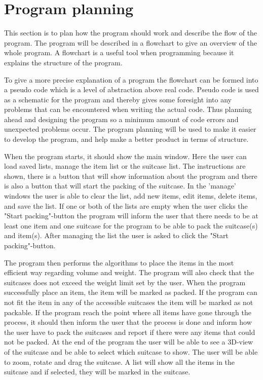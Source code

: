 \section{Program planning}
This section is to plan how the program should work and describe the flow of the program. The program will be described in a flowchart to give an overview of the whole program. A flowchart is a useful tool when programming because it explains the structure of the program.

To give a more precise explanation of a program the flowchart can be formed into a pseudo code which is a level of abstraction above real code. Pseudo code is used as a schematic for the program and thereby gives some foresight into any problems that can be encountered when writing the actual code. Thus planning ahead and designing the program so a minimum amount of code errors and unexpected problems occur.
The program planning will be used to make it easier to develop the program, and help make a better product in terms of structure.

When the program starts, it should show the main window. Here the user can load saved lists, manage the item list or the suitcase list. The instructions are shown, there is a button that will show information about the program and there is also a button that will start the packing of the suitcase. In the 'manage' windows the user is able to clear the list, add new items, edit items, delete items, and save the list. If one or both of the lists are empty when the user clicks the "Start packing"-button the program will inform the user that there needs to be at least one item and one suitcase for the program to be able to pack the suitcase(s) and item(s). After managing the list the user is asked to click the "Start packing"-button.

The program then performs the algorithms to place the items in the most efficient way regarding volume and weight. The program will also check that the suitcases does not exceed the weight limit set by the user.
When the program successfully place an item, the item will be marked as packed. If the program can not fit the item in any of the accessible suitcases the item will be marked as not packable. If the program reach the point where all items have gone through the process, it should then inform the user that the process is done and inform how the user have to pack the suitcases and report if there were any items that could not be packed.
At the end of the program the user will be able to see a 3D-view of the suitcase and be able to select which suitcase to show. The user will be able to zoom, rotate and drag the suitcase. A list will show all the items in the suitcase and if selected, they will be marked in the suitcase.

